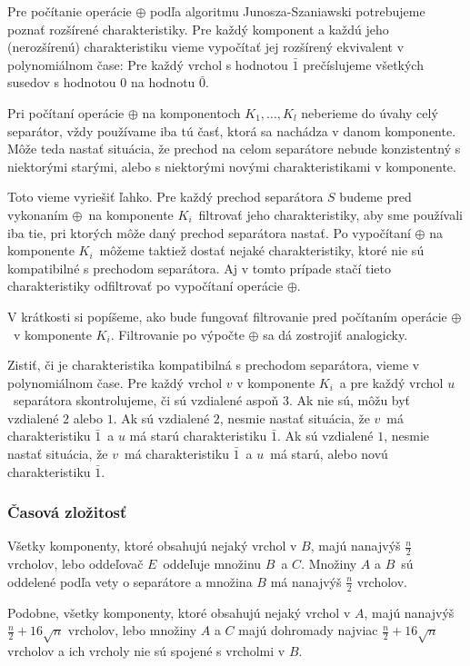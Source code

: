 Pre počítanie operácie $\oplus$ podľa algoritmu Junosza-Szaniawski potrebujeme poznať rozšírené charakteristiky.
Pre každý komponent a každú jeho (nerozšírenú) charakteristiku vieme vypočítať jej rozšírený ekvivalent v
polynomiálnom čase: Pre každý vrchol s hodnotou $\bar{1}$ prečíslujeme všetkých susedov s hodnotou $0$
na hodnotu $\bar{0}$.

Pri počítaní operácie $\oplus$ na komponentoch $K_1, \ldots, K_l$ neberieme do úvahy celý separátor,
vždy používame iba tú časť, ktorá sa nachádza v danom komponente. Môže teda nastať situácia, že
prechod na celom separátore nebude konzistentný s niektorými starými, alebo s niektorými novými
charakteristikami v komponente.

Toto vieme vyriešiť ľahko. Pre
každý prechod separátora $S$ budeme pred vykonaním $\oplus$ na komponente $K_i$ filtrovať jeho
charakteristiky, aby sme používali iba tie, pri ktorých môže daný prechod separátora nastať. Po vypočítaní
$\oplus$ na komponente $K_i$ môžeme taktiež dostať nejaké charakteristiky, ktoré nie sú kompatibilné
s prechodom separátora. Aj v tomto prípade stačí tieto charakteristiky odfiltrovať po vypočítaní
operácie $\oplus$.

V krátkosti si popíšeme, ako bude fungovať filtrovanie pred počítaním operácie $\oplus$ v komponente $K_i$.
Filtrovanie po výpočte $\oplus$ sa dá zostrojiť analogicky.

Zistiť, či je charakteristika kompatibilná s prechodom separátora, vieme v polynomiálnom čase. Pre
každý vrchol $v$ v komponente $K_i$ a pre každý vrchol $u$ separátora skontrolujeme, či sú vzdialené
aspoň $3$. Ak nie sú, môžu byť vzdialené $2$ alebo $1$. Ak sú vzdialené $2$, nesmie nastať situácia,
že $v$ má charakteristiku $\bar{1}$ a $u$ má starú charakteristiku $\bar{1}$. Ak sú vzdialené $1$,
nesmie nastať situácia, že $v$ má charakteristiku $\bar{1}$ a $u$ má starú, alebo novú charakteristiku
$\bar{1}$.

\subsubsection{Časová zložitosť}

Všetky komponenty, ktoré obsahujú nejaký vrchol v $B$, majú nanajvýš $\frac{n}{2}$ vrcholov, lebo
oddeľovač $E$ oddeľuje množinu $B$ a $C$. Množiny $A$ a $B$ sú oddelené podľa vety o separátore
a množina $B$ má nanajvýš $\frac{n}{2}$ vrcholov.

Podobne, všetky komponenty, ktoré obsahujú nejaký vrchol v $A$, majú nanajvýš $\frac{n}{2} + 16 \sqrt{n}$
vrcholov, lebo množiny $A$ a $C$ majú dohromady najviac $\frac{n}{2} + 16 \sqrt{n}$ vrcholov a ich vrcholy
nie sú spojené s vrcholmi v $B$.

